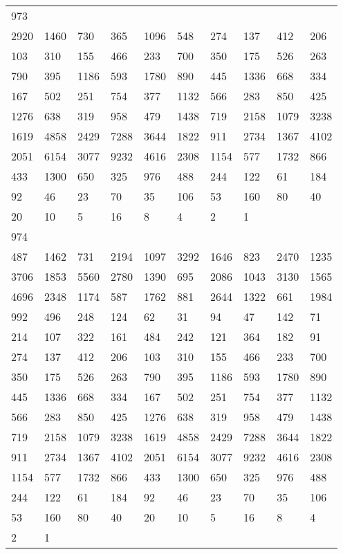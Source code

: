 \begin{longtable}{*{10}{l}}
973&&&&&&&&&\\
2920& 1460& 730& 365& 1096& 548& 274& 137& 412& 206\\
103& 310& 155& 466& 233& 700& 350& 175& 526& 263\\
790& 395& 1186& 593& 1780& 890& 445& 1336& 668& 334\\
167& 502& 251& 754& 377& 1132& 566& 283& 850& 425\\
1276& 638& 319& 958& 479& 1438& 719& 2158& 1079& 3238\\
1619& 4858& 2429& 7288& 3644& 1822& 911& 2734& 1367& 4102\\
2051& 6154& 3077& 9232& 4616& 2308& 1154& 577& 1732& 866\\
433& 1300& 650& 325& 976& 488& 244& 122& 61& 184\\
92& 46& 23& 70& 35& 106& 53& 160& 80& 40\\
20& 10& 5& 16& 8& 4& 2& 1& \\

974&&&&&&&&&\\
487& 1462& 731& 2194& 1097& 3292& 1646& 823& 2470& 1235\\
3706& 1853& 5560& 2780& 1390& 695& 2086& 1043& 3130& 1565\\
4696& 2348& 1174& 587& 1762& 881& 2644& 1322& 661& 1984\\
992& 496& 248& 124& 62& 31& 94& 47& 142& 71\\
214& 107& 322& 161& 484& 242& 121& 364& 182& 91\\
274& 137& 412& 206& 103& 310& 155& 466& 233& 700\\
350& 175& 526& 263& 790& 395& 1186& 593& 1780& 890\\
445& 1336& 668& 334& 167& 502& 251& 754& 377& 1132\\
566& 283& 850& 425& 1276& 638& 319& 958& 479& 1438\\
719& 2158& 1079& 3238& 1619& 4858& 2429& 7288& 3644& 1822\\
911& 2734& 1367& 4102& 2051& 6154& 3077& 9232& 4616& 2308\\
1154& 577& 1732& 866& 433& 1300& 650& 325& 976& 488\\
244& 122& 61& 184& 92& 46& 23& 70& 35& 106\\
53& 160& 80& 40& 20& 10& 5& 16& 8& 4\\
2& 1& \\


\end{longtable}
